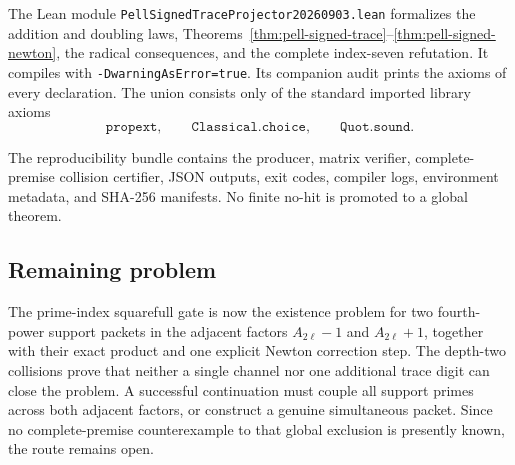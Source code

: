 The Lean module
\texttt{PellSignedTraceProjector}\allowbreak\texttt{20260903.lean}
formalizes the addition and
doubling laws, Theorems~\ref{thm:pell-signed-trace}--\ref{thm:pell-signed-newton}, the radical
consequences, and the complete index-seven refutation.  It compiles with
\texttt{-DwarningAsError=true}.  Its companion audit prints the axioms of
every declaration.  The union consists only of the standard imported
library axioms
\[
 \mathtt{propext},\qquad
 \mathtt{Classical.choice},\qquad
 \mathtt{Quot.sound}.
\]

The reproducibility bundle contains the producer, matrix verifier,
complete-premise collision certifier, JSON outputs, exit codes, compiler
logs, environment metadata, and SHA-256 manifests.  No finite no-hit is
promoted to a global theorem.

\subsection{Remaining problem}

The prime-index squarefull gate is now the existence problem for two
fourth-power support packets in the adjacent factors
$A_{2\ell}-1$ and $A_{2\ell}+1$, together with their exact product and one
explicit Newton correction step.  The depth-two collisions prove
that neither a single channel nor one additional trace digit can close the
problem.  A successful continuation must couple all support primes across
both adjacent factors, or construct a genuine simultaneous packet.  Since
no complete-premise counterexample to that global exclusion is presently
known, the route remains open.

